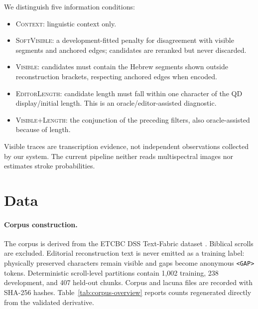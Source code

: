\documentclass[10pt,twocolumn,a4paper]{article}
\begin{document}
We distinguish five information conditions:

\begin{itemize}
  \item \textsc{Context}: linguistic context only.
  \item \textsc{SoftVisible}: a development-fitted penalty for disagreement with visible segments and anchored edges; candidates are reranked but never discarded.
  \item \textsc{Visible}: candidates must contain the Hebrew segments shown outside reconstruction brackets, respecting anchored edges when encoded.
  \item \textsc{EditorLength}: candidate length must fall within one character of the QD display/initial length. This is an oracle/editor-assisted diagnostic.
  \item \textsc{Visible+Length}: the conjunction of the preceding filters, also oracle-assisted because of length.
\end{itemize}

Visible traces are transcription evidence, not independent observations collected by our system. The current pipeline neither reads multispectral images nor estimates stroke probabilities.

\section{Data}

\paragraph{Corpus construction.}
The corpus is derived from the ETCBC DSS Text-Fabric dataset \cite{etcbcdss}. Biblical scrolls are excluded. Editorial reconstruction text is never emitted as a training label: physically preserved characters remain visible and gaps become anonymous \texttt{<GAP>} tokens. Deterministic scroll-level partitions contain 1,002 training, 238 development, and 407 held-out chunks. Corpus and lacuna files are recorded with SHA-256 hashes. Table~\ref{tab:corpus-overview} reports counts regenerated directly from the validated derivative.

\CorpusOverviewTable
\end{document}
